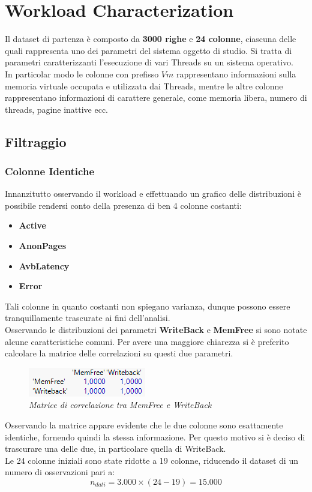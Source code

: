 \chapter{Workload Characterization}
Il dataset di partenza è composto da \textbf{3000 righe} e \textbf{24 colonne}, ciascuna delle quali rappresenta uno dei parametri del sistema oggetto di studio. Si tratta di parametri caratterizzanti l'esecuzione di vari Threads su un sistema operativo.
\\In particolar modo le colonne con prefisso $Vm$ rappresentano informazioni sulla memoria virtuale occupata e utilizzata dai Threads, mentre le altre colonne rappresentano informazioni di carattere generale, come memoria libera, numero di threads, pagine inattive ecc.

\section{Filtraggio}

\subsection{Colonne Identiche}
Innanzitutto osservando il workload e effettuando un grafico delle distribuzioni è possibile rendersi conto della presenza di ben 4 colonne costanti:
\begin{itemize}
	\item \textbf{Active}
	\item \textbf{AnonPages}
	\item \textbf{AvbLatency}
	\item \textbf{Error}
\end{itemize}
Tali colonne in quanto costanti non spiegano varianza, dunque possono essere tranquillamente trascurate ai fini dell'analisi.
\\Osservando le distribuzioni dei parametri \textbf{WriteBack} e \textbf{MemFree} si sono notate alcune caratteristiche comuni. Per avere una maggiore chiarezza si è preferito calcolare la matrice delle correlazioni su questi due parametri.
\begin{figure}[H]
	\centering
	\includegraphics{img/hw1/correlazione_mem_writeback.png}
	\caption{\textit{Matrice di correlazione tra MemFree e WriteBack}}
\end{figure}
Osservando la matrice appare evidente che le due colonne sono esattamente identiche, fornendo quindi la stessa informazione. Per questo motivo si è deciso di trascurare una delle due, in particolare quella di WriteBack.
\\Le 24 colonne iniziali sono state ridotte a 19 colonne, riducendo il dataset di un numero di osservazioni pari a:
\begin{equation}
	n_{dati} = 3.000 \times (24 - 19) = 15.000
\end{equation}


